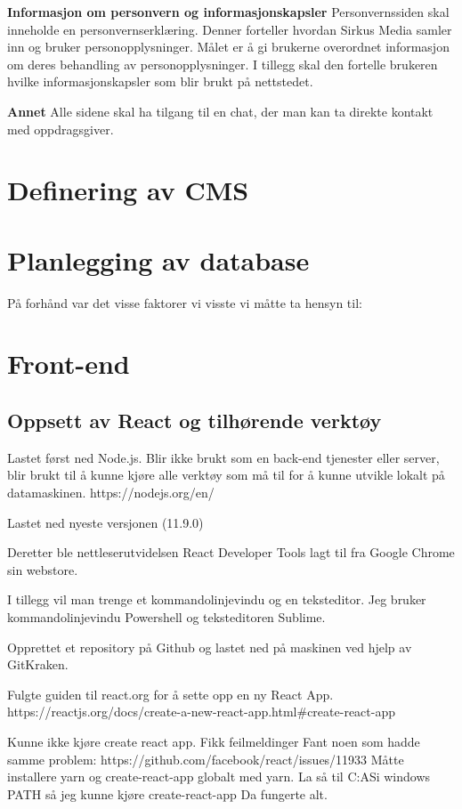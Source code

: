 \textbf{Informasjon om personvern og informasjonskapsler} Personvernssiden skal inneholde en personvernserklæring. Denner forteller hvordan Sirkus Media samler inn og bruker personopplysninger. Målet er å gi brukerne overordnet informasjon om deres behandling av personopplysninger. I tillegg skal den fortelle brukeren hvilke informasjonskapsler som blir brukt på nettstedet.

\textbf{Annet} Alle sidene skal ha tilgang til en chat, der man kan ta direkte kontakt med oppdragsgiver.

\section{Definering av CMS}

\section{Planlegging av database}

På forhånd var det visse faktorer vi visste vi måtte ta hensyn til:


\section{Front-end}

\subsection{Oppsett av React og tilhørende verktøy}

Lastet først ned Node.js. Blir ikke brukt som en back-end tjenester eller server, blir brukt til å kunne kjøre alle verktøy som må til for å kunne utvikle lokalt på datamaskinen. https://nodejs.org/en/

Lastet ned nyeste versjonen (11.9.0)

Deretter ble nettleserutvidelsen React Developer Tools lagt til fra Google Chrome sin webstore.

I tillegg vil man trenge et kommandolinjevindu og en teksteditor. Jeg bruker kommandolinjevindu Powershell og teksteditoren Sublime.

Opprettet et repository på Github og lastet ned på maskinen ved hjelp av GitKraken. 

Fulgte guiden til react.org for å sette opp en ny React App. https://reactjs.org/docs/create-a-new-react-app.html#create-react-app



Kunne ikke kjøre create react app. Fikk feilmeldinger
Fant noen som hadde samme problem: https://github.com/facebook/react/issues/11933
Måtte installere yarn og create-react-app globalt med yarn.
La så til C:\Users\Datahjelpen AS\AppData\Local\Yarn\bin i windows PATH så jeg kunne kjøre create-react-app
Da fungerte alt.


\clearpage